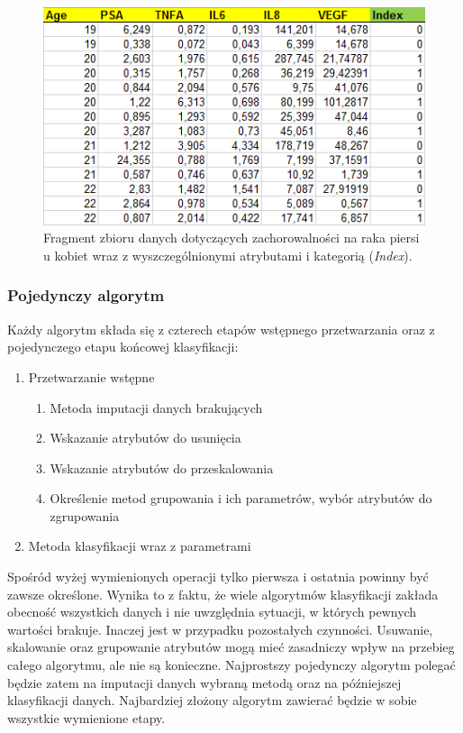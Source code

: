 \documentclass[../thesis.tex]{subfiles}
\begin{document}
\begin{figure}[h]
\centering
\includegraphics{data.png}
\caption{Fragment zbioru danych dotyczących zachorowalności na raka piersi u kobiet wraz z wyszczególnionymi atrybutami i kategorią (\textit{Index}).}
\label{req:data}
\end{figure}

\subsubsection{Pojedynczy algorytm}

Każdy algorytm składa się z czterech etapów wstępnego przetwarzania oraz z pojedynczego etapu końcowej klasyfikacji:
\begin{enumerate}
	\item Przetwarzanie wstępne
	\begin{enumerate}
		\item Metoda imputacji danych brakujących
		\item Wskazanie atrybutów do usunięcia
		\item Wskazanie atrybutów do przeskalowania
		\item Określenie metod grupowania i ich parametrów, wybór atrybutów do zgrupowania
	\end{enumerate}
	\item Metoda klasyfikacji wraz z parametrami
\end{enumerate}

Spośród wyżej wymienionych operacji tylko pierwsza i ostatnia powinny być zawsze określone. Wynika to z faktu, że wiele algorytmów klasyfikacji zakłada obecność wszystkich danych i nie uwzględnia sytuacji, w których pewnych wartości brakuje. Inaczej jest w przypadku pozostałych czynności. Usuwanie, skalowanie oraz grupowanie atrybutów mogą mieć zasadniczy wpływ na przebieg całego algorytmu, ale nie są konieczne. Najprostszy pojedynczy algorytm polegać będzie zatem na imputacji danych wybraną metodą oraz na późniejszej klasyfikacji danych. Najbardziej złożony algorytm zawierać będzie w sobie wszystkie wymienione etapy. 
\end{document}
